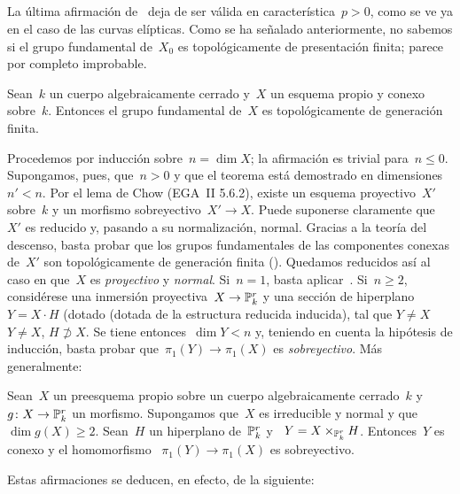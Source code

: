 \setcounter{subsection}{7}
\subsection{}
\label{X.2.8}
La última afirmación
{}
{de~}
deja de ser válida en característica~$p>0$, como se ve ya en el caso de las
curvas elípticas. Como se ha señalado anteriormente, no sabemos si el grupo
fundamental de~$X_0$ es topológicamente de presentación finita; parece por
completo improbable.

\setcounter{proposition}{8}
\begin{theoreme}
\label{X.2.9}
Sean~$k$ un cuerpo algebraicamente cerrado y~$X$ un esquema propio y conexo
sobre~$k$. Entonces el grupo fundamental de~$X$ es topológicamente de
generación finita.
\end{theoreme}

Procedemos
por inducción sobre~$n=\dim X$; la afirmación es trivial para~$n\le 0$.
Supongamos, pues, que~$n>0$ y que el teorema está demostrado en dimensiones
~$n'<n$. Por el lema de Chow (EGA~II 5.6.2), existe un esquema proyectivo~$X'$
sobre~$k$ y un morfismo sobreyectivo~$X'\to X$. Puede suponerse claramente
que~$X'$ es reducido y, pasando a su normalización, normal. Gracias a la teoría
del descenso, basta probar que los grupos fundamentales de las componentes
conexas de~$X'$ son topológicamente de generación finita
(). Quedamos reducidos así al caso en que~$X$ es \emph{proyectivo}
y \emph{normal}. Si~$n=1$, basta aplicar~. Si~$n\ge 2$, considérese
una inmersión proyectiva~$X\to\mathbb P_k^r$ y una sección de hiperplano~$Y=X\cdot H$
{(dotado}
{(dotada}
de la estructura reducida inducida), tal que
{$Y\ne X$}
{$Y\ne X$,}
\ie $H\not\supset X$. Se tiene entonces~$\dim Y<n$ y, teniendo en cuenta la
hipótesis de inducción, basta probar que~$\pi_1(Y)\to\pi_1(X)$ es
\emph{sobreyectivo}. Más generalmente:

\begin{lemme}
\label{X.2.10}
Sean~$X$ un preesquema propio sobre un cuerpo algebraicamente cerrado~$k$ y
~$g\colon X\to\mathbb P_k^r$ un morfismo. Supongamos que~$X$ es irreducible y normal
y que~$\dim g(X)\ge 2$. Sean~$H$ un hiperplano de~$\mathbb P_k^r$ y
~$Y=X\times_{\mathbb P_k^r}H$. Entonces~$Y$ es conexo y el homomorfismo
~$\pi_1(Y)\to\pi_1(X)$ es sobreyectivo.
\end{lemme}

Estas afirmaciones se deducen, en efecto, de la siguiente:

